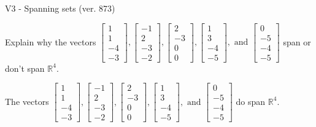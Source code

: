 \begin{exercise}
  \begin{exerciseTitle}V3 - Spanning sets (ver. 873)\end{exerciseTitle}
  \begin{exerciseStatement}
    Explain why the vectors \(\left[\begin{array}{r}
1 \\
1 \\
-4 \\
-3
\end{array}\right] , \left[\begin{array}{r}
-1 \\
2 \\
-3 \\
-2
\end{array}\right] , \left[\begin{array}{r}
2 \\
-3 \\
0 \\
0
\end{array}\right] , \left[\begin{array}{r}
1 \\
3 \\
-4 \\
-5
\end{array}\right] , \text{ and } \left[\begin{array}{r}
0 \\
-5 \\
-4 \\
-5
\end{array}\right]\) span or don't span \(\mathbb{R}^4\). 
	


  \end{exerciseStatement}
  \begin{exerciseAnswer}
   The vectors \(\left[\begin{array}{r}
1 \\
1 \\
-4 \\
-3
\end{array}\right] , \left[\begin{array}{r}
-1 \\
2 \\
-3 \\
-2
\end{array}\right] , \left[\begin{array}{r}
2 \\
-3 \\
0 \\
0
\end{array}\right] , \left[\begin{array}{r}
1 \\
3 \\
-4 \\
-5
\end{array}\right] , \text{ and } \left[\begin{array}{r}
0 \\
-5 \\
-4 \\
-5
\end{array}\right]\) 
  	 do  
	span \(\mathbb{R}^4\).
  



\end{exerciseAnswer}
\end{exercise}
